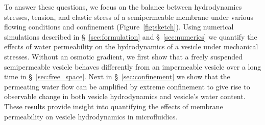 \documentclass[prb,preprint,showpacs,preprintnumbers,amsmath,amssymb,longbibliography]{revtex4-1}
\begin{document}
To answer these
questions, we focus on the balance between hydrodynamics stresses,
tension, and elastic stress of a semipermeable membrane under various
flowing conditions and confinement (Figure~\ref{fig:sketch}).
%
Using numerical simulations described in \S~\ref{sec:formulation} and
\S~\ref{sec:numerics} we quantify the effects of water permeability on
the hydrodynamics of a vesicle under mechanical stresses.  Without an
osmotic gradient, we first show that a freely suspended semipermeable
vesicle behaves differently from an impermeable vesicle over a long time
in \S~\ref{sec:free_space}. Next in \S~\ref{sec:confinement} we show
that
the permeating water flow can be amplified by extreme confinement to give rise to observable change in both  vesicle hydrodynamics and vesicle's water content. 
These results provide insight into quantifying the effects of membrane permeability on vesicle hydrodynamics in microfluidics.
%
 
\end{document}

